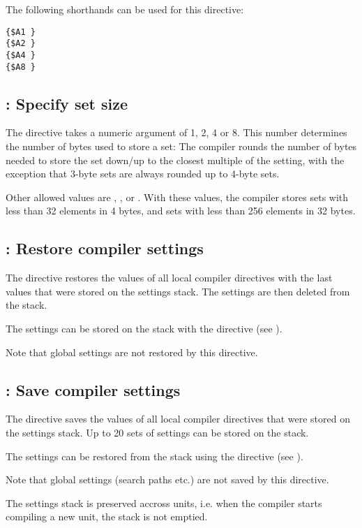 The following shorthands can be used for this directive:
\begin{verbatim}
{$A1 }
{$A2 }
{$A4 }
{$A8 }
\end{verbatim}

\subsection{ : Specify set size}
\label{se:Packset}
The  directive takes a numeric argument of 1, 2, 4 or 8.
This number determines the number of bytes used to store a set: 
The compiler rounds the number of bytes needed to store the set 
down/up to the closest multiple of the  setting, 
with the exception that 3-byte sets are always rounded up to 4-byte 
sets.

Other allowed values are , , or . 
With these values, the compiler stores sets with less than 32 elements 
in 4 bytes, and sets with less than 256 elements in 32 bytes. 

\subsection{ : Restore compiler settings}
\label{se:Pop}
The  directive restores the values of all local compiler
directives with the last values that were stored on the settings stack. 
The settings are then deleted from the stack.

The settings can be stored on the stack with the  directive
(see ).

Note that global settings are not restored by this directive.

\subsection{ : Save compiler settings}
\label{se:Push}
The  directive saves the values of all local compiler
directives that were stored on the settings stack. Up to 20 sets of
settings can be stored on the stack.

The settings can be restored from the stack using the  directive
(see ).

Note that global settings (search paths etc.) are not saved by this 
directive.

The settings stack is preserved accross units, i.e. when the compiler starts
compiling a new unit, the stack is not emptied.

